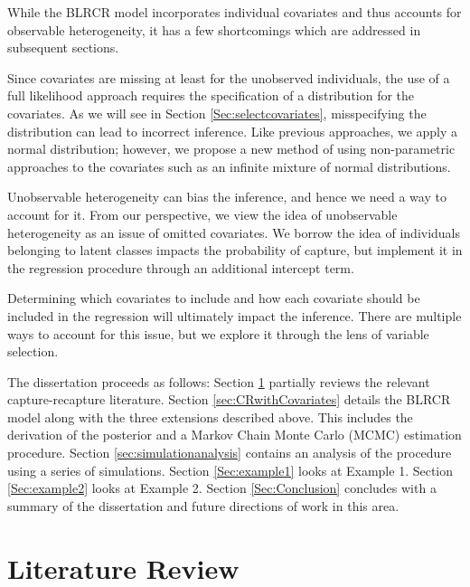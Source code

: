 \documentclass[
  12pt,
]{article}
\begin{document}
While the BLRCR model incorporates individual covariates and thus
accounts for observable heterogeneity, it has a few shortcomings which
are addressed in subsequent sections.

\begin{list}{}{}
\item[1)] Since covariates are missing at least for the unobserved individuals, the use of a full likelihood approach requires the specification of a distribution for the covariates. As we will see in Section \ref{Sec:selectcovariates}, misspecifying the distribution can lead to incorrect inference. Like previous approaches, we apply a normal distribution; however, we propose a new method of using non-parametric approaches to the covariates such as an infinite mixture of normal distributions.

\item[2)] Unobservable heterogeneity can bias the inference, and hence we need a way to account for it. From our perspective, we view the idea of unobservable heterogeneity as an issue of omitted covariates. We borrow the idea of individuals belonging to latent classes impacts the probability of capture\citep{manriquevallier_bayesian_2016}, but implement it in the regression procedure through an additional intercept term. 

\item[3)] Determining which covariates to include and how each covariate should be included in the regression will ultimately impact the inference. There are multiple ways to account for this issue, but we explore it through the lens of variable selection.

\end{list}

The dissertation proceeds as follows: Section \ref{Sec:litreview}
partially reviews the relevant capture-recapture literature. Section
\ref{sec:CRwithCovariates} details the BLRCR model along with the three
extensions described above. This includes the derivation of the
posterior and a Markov Chain Monte Carlo (MCMC) estimation procedure.
Section \ref{sec:simulationanalysis} contains an analysis of the
procedure using a series of simulations. Section \ref{Sec:example1}
looks at Example 1. Section \ref{Sec:example2} looks at Example 2.
Section \ref{Sec:Conclusion} concludes with a summary of the
dissertation and future directions of work in this area.

\newpage
\section{Literature Review}
\label{Sec:litreview}
\end{document}
